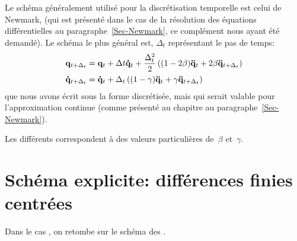 \medskip
Le schéma généralement utilisé pour la discrétisation temporelle est celui de Newmark, (qui est présenté dans le cas de la résolution des équations différentielles au paragraphe~\ref{Sec-Newmark}, ce complément nous ayant été demandé).
Le schéma le plus général est, $\Delta_t$ représentant le pas de temps:
\begin{equation}\colorblue
\begin{aligned}
&\VV{q}_{t+\Delta_t} = \VV{q}_t + \Delta t \VV{\dot q}_t + \frac{\Delta_t^2}2\left((1-2\beta)\VV{\ddot q}_t
+2\beta\VV{\ddot q}_{t+\Delta_t}\right) \\
&\VV{\dot q}_{t+\Delta_t} = \VV{\dot q}_t+\Delta_t\left((1-\gamma)\VV{\ddot q}_t+\gamma\VV{\ddot q}_{t+\Delta_t}
\right)
\end{aligned}
\end{equation}
que nous avons écrit sous la forme discrétisée, mais qui serait valable pour l'approximation continue (comme présenté au chapitre au paragraphe~\ref{Sec-Newmark}).

Les différents  correspondent à des valeurs particulières de~$\beta$ et~$\gamma$.



\bigskip
\section{Schéma explicite: différences finies centrées}

Dans le cas , on retombe sur le schéma des .

